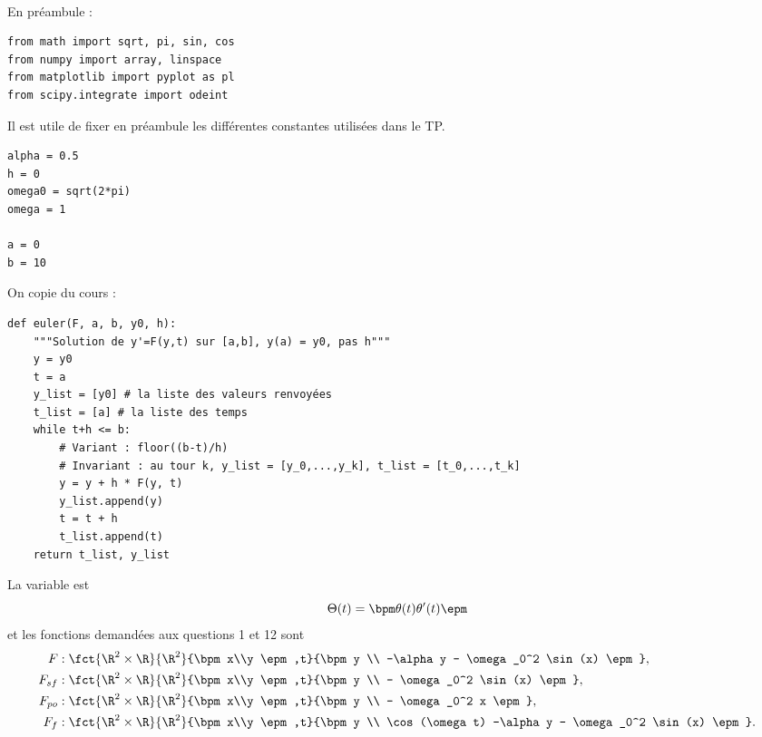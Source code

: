 \exer{[EQD-007]}
\setcounter{numques}{0}~\\

En préambule : 
\begin{lstlisting}
from math import sqrt, pi, sin, cos
from numpy import array, linspace
from matplotlib import pyplot as pl
from scipy.integrate import odeint
\end{lstlisting}

Il est utile de fixer en préambule les différentes constantes utilisées dans le TP.
\begin{lstlisting}
alpha = 0.5
h = 0
omega0 = sqrt(2*pi)
omega = 1

a = 0
b = 10
\end{lstlisting}

On copie du cours : 
\begin{lstlisting}
def euler(F, a, b, y0, h):
    """Solution de y'=F(y,t) sur [a,b], y(a) = y0, pas h"""
    y = y0
    t = a
    y_list = [y0] # la liste des valeurs renvoyées
    t_list = [a] # la liste des temps
    while t+h <= b:
        # Variant : floor((b-t)/h)
        # Invariant : au tour k, y_list = [y_0,...,y_k], t_list = [t_0,...,t_k]
        y = y + h * F(y, t)
        y_list.append(y)
        t = t + h
        t_list.append(t)
    return t_list, y_list
\end{lstlisting}

\question{}
La variable est 
\begin{equation*}
  \Theta(t) = \bpm \theta(t) \\ \theta'(t) \epm
\end{equation*}
et les fonctions demandées aux questions 1 et 12 sont 
\begin{align*}
  F&:\fct{\R^2\times \R}{\R^2}{\bpm x\\y \epm,t}{\bpm y \\ -\alpha y - \omega_0^2 \sin(x) \epm},\\
  F_{sf}&:\fct{\R^2\times \R}{\R^2}{\bpm x\\y \epm,t}{\bpm y \\ - \omega_0^2 \sin(x) \epm},\\
  F_{po}&:\fct{\R^2\times \R}{\R^2}{\bpm x\\y \epm,t}{\bpm y \\ - \omega_0^2 x \epm},\\
  F_{f}&:\fct{\R^2\times \R}{\R^2}{\bpm x\\y \epm,t}{\bpm y \\ \cos(\omega t) -\alpha y - \omega_0^2 \sin(x) \epm}.
\end{align*}

